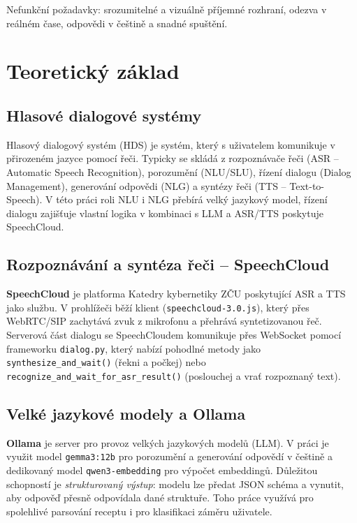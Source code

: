 \documentclass[11pt,a4paper]{article}
\begin{document}
Nefunkční požadavky: srozumitelné a vizuálně příjemné rozhraní, odezva v reálném
čase, odpovědi v češtině a snadné spuštění.

\section{Teoretický základ}

\subsection{Hlasové dialogové systémy}
Hlasový dialogový systém (HDS) je systém, který s uživatelem komunikuje v přirozeném
jazyce pomocí řeči. Typicky se skládá z rozpoznávače řeči (ASR -- Automatic Speech
Recognition), porozumění (NLU/SLU), řízení dialogu (Dialog Management), generování
odpovědi (NLG) a syntézy řeči (TTS -- Text-to-Speech). V této práci roli NLU i NLG
přebírá velký jazykový model, řízení dialogu zajišťuje vlastní logika v kombinaci
s LLM a ASR/TTS poskytuje SpeechCloud.

\subsection{Rozpoznávání a syntéza řeči -- SpeechCloud}
\textbf{SpeechCloud} je platforma Katedry kybernetiky ZČU poskytující ASR a TTS jako
službu. V prohlížeči běží klient (\texttt{speechcloud-3.0.js}), který přes WebRTC/SIP
zachytává zvuk z mikrofonu a přehrává syntetizovanou řeč. Serverová část dialogu se
SpeechCloudem komunikuje přes WebSocket pomocí frameworku \texttt{dialog.py}, který
nabízí pohodlné metody jako \texttt{synthesize\_and\_wait()} (řekni a počkej) nebo
\texttt{recognize\_and\_wait\_for\_asr\_result()} (poslouchej a vrať rozpoznaný text).

\subsection{Velké jazykové modely a Ollama}
\textbf{Ollama} je server pro provoz velkých jazykových modelů (LLM). V práci je využit
model \texttt{gemma3:12b} pro porozumění a generování odpovědí v češtině a dedikovaný
model \texttt{qwen3-embedding} pro výpočet embeddingů. Důležitou schopností je
\emph{strukturovaný výstup}: modelu lze předat JSON schéma a vynutit, aby odpověď
přesně odpovídala dané struktuře. Toho práce využívá pro spolehlivé parsování receptu
i pro klasifikaci záměru uživatele.
\end{document}
